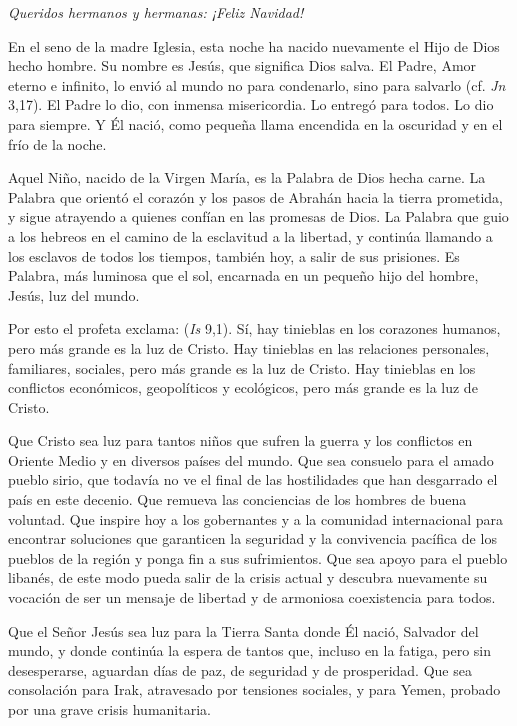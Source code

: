\emph{Queridos hermanos y hermanas: ¡Feliz Navidad!}

En el seno de la madre Iglesia, esta noche ha nacido nuevamente el Hijo de Dios hecho hombre. Su nombre es Jesús, que significa Dios salva. El Padre, Amor eterno e infinito, lo envió al mundo no para condenarlo, sino para salvarlo (cf. \emph{Jn} 3,17). El Padre lo dio, con inmensa misericordia. Lo entregó para todos. Lo dio para siempre. Y Él nació, como pequeña llama encendida en la oscuridad y en el frío de la noche.

Aquel Niño, nacido de la Virgen María, es la Palabra de Dios hecha carne. La Palabra que orientó el corazón y los pasos de Abrahán hacia la tierra prometida, y sigue atrayendo a quienes confían en las promesas de Dios. La Palabra que guio a los hebreos en el camino de la esclavitud a la libertad, y continúa llamando a los esclavos de todos los tiempos, también hoy, a salir de sus prisiones. Es Palabra, más luminosa que el sol, encarnada en un pequeño hijo del hombre, Jesús, luz del mundo.

Por esto el profeta exclama:  (\emph{Is} 9,1). Sí, hay tinieblas en los corazones humanos, pero más grande es la luz de Cristo. Hay tinieblas en las relaciones personales, familiares, sociales, pero más grande es la luz de Cristo. Hay tinieblas en los conflictos económicos, geopolíticos y ecológicos, pero más grande es la luz de Cristo.

Que Cristo sea luz para tantos niños que sufren la guerra y los conflictos en Oriente Medio y en diversos países del mundo. Que sea consuelo para el amado pueblo sirio, que todavía no ve el final de las hostilidades que han desgarrado el país en este decenio. Que remueva las conciencias de los hombres de buena voluntad. Que inspire hoy a los gobernantes y a la comunidad internacional para encontrar soluciones que garanticen la seguridad y la convivencia pacífica de los pueblos de la región y ponga fin a sus sufrimientos. Que sea apoyo para el pueblo libanés, de este modo pueda salir de la crisis actual y descubra nuevamente su vocación de ser un mensaje de libertad y de armoniosa coexistencia para todos.

Que el Señor Jesús sea luz para la Tierra Santa donde Él nació, Salvador del mundo, y donde continúa la espera de tantos que, incluso en la fatiga, pero sin desesperarse, aguardan días de paz, de seguridad y de prosperidad. Que sea consolación para Irak, atravesado por tensiones sociales, y para Yemen, probado por una grave crisis humanitaria.

